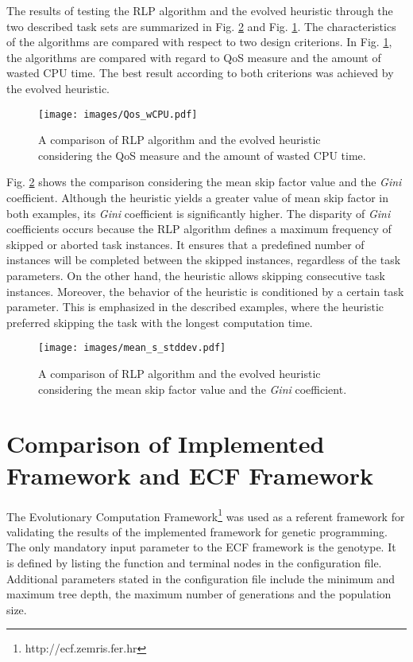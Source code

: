 The results of testing the RLP algorithm and the evolved heuristic through the two described task sets are summarized in Fig. \ref{cmp2} and Fig. \ref{cmp1}.
The characteristics of the algorithms are compared with respect to two design criterions. 
In Fig. \ref{cmp1}, the algorithms are compared with regard to QoS measure and the amount of wasted CPU time. The best result according to both criterions was achieved by the evolved heuristic. 
\begin{figure}[H]
    \centering
    \texttt{[image: images/Qos\_wCPU.pdf]}
    \caption{A comparison of RLP algorithm and the evolved heuristic considering the QoS measure and the amount of wasted CPU time.}
    \label{cmp1}
\end{figure}

Fig. \ref{cmp2} shows the comparison considering the mean skip factor value and the \textit{Gini} coefficient. 
Although the heuristic yields a greater value of mean skip factor in both examples, its \textit{Gini} coefficient is significantly higher.
The disparity of \textit{Gini} coefficients occurs because the RLP algorithm defines a maximum frequency of skipped or aborted task instances.
It ensures that a predefined number of instances will be completed between the skipped instances, regardless of the task parameters.
On the other hand, the heuristic allows skipping consecutive task instances.
Moreover, the behavior of the heuristic is conditioned by a certain task parameter.
This is emphasized in the described examples, where the heuristic preferred skipping the task with the longest computation time.
\begin{figure}[H]
    \centering
    \texttt{[image: images/mean\_s\_stddev.pdf]}
    \caption{A comparison of RLP algorithm and the evolved heuristic considering the mean skip factor value and the \textit{Gini} coefficient.}
    \label{cmp2}
\end{figure}

\section{Comparison of Implemented Framework and ECF Framework}
The Evolutionary Computation Framework\footnote{http://ecf.zemris.fer.hr} was used as a referent framework for validating the results of the implemented framework for genetic programming.
The only mandatory input parameter to the ECF framework is the genotype.
It is defined by listing the function and terminal nodes in the configuration file.
Additional parameters stated in the configuration file include the minimum and maximum tree depth, the maximum number of generations and the population size.

